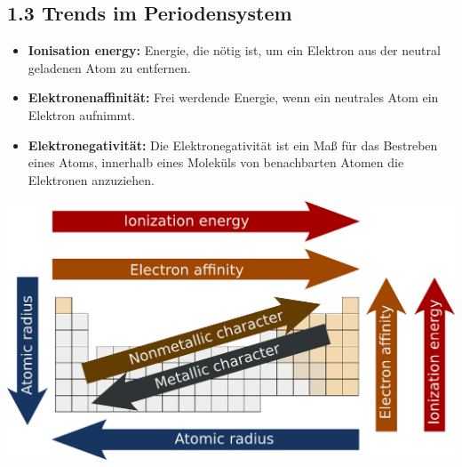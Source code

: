 \subsection{1.3 Trends im Periodensystem}
	\begin{itemize}
    	\item \textbf{Ionisation energy: }Energie, die nötig ist, um ein Elektron aus der neutral geladenen Atom zu entfernen.
    	\item \textbf{Elektronenaffinität:} Frei werdende Energie, wenn ein neutrales Atom ein Elektron aufnimmt.
    	\item \textbf{Elektronegativität:} Die Elektronegativität ist ein Maß für das Bestreben eines Atoms, innerhalb eines Moleküls von benachbarten Atomen die Elektronen anzuziehen.
	\end{itemize}
	\includegraphics[width=1\linewidth]{src/1_basics/Periodic_trends.pdf}